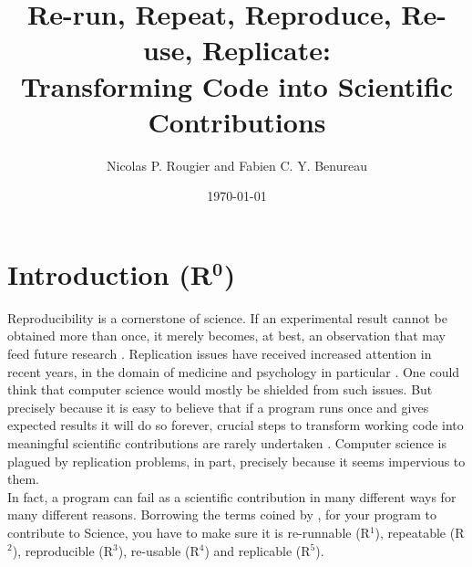 \documentclass[a4paper,11pt]{article}
\title{Re-run, Repeat, Reproduce, Re-use, Replicate:\\Transforming Code into Scientific Contributions}
\author{Nicolas P. Rougier and Fabien C. Y. Benureau}
\date{\today}
\begin{document}
\maketitle
\section*{Introduction (R$^{\mathbf 0}$)}

Reproducibility is a cornerstone of science. 
% 
% 
% 
% 
% 
% 
%
%
If an experimental result cannot be obtained more than once,
it merely becomes, at best, an observation that
may feed future research \cite{Mesirov:2010,osc:2015}. 
Replication issues have received increased attention in recent years,
in the domain of medicine and psychology in particular \cite{Iqbal:2016}.
One could think that computer science would mostly be shielded from such issues.
But precisely because it is easy to believe that
if a program runs once and gives expected results it will do so forever, 
crucial steps to transform working code into meaningful scientific contributions are rarely undertaken \citep{Sandve:2013,Schwab:2000}. 
Computer science is plagued by replication problems,
in part, precisely because it seems impervious to them.\\

In fact, a program can fail as a scientific contribution
in many different ways for many different reasons.
Borrowing the terms coined by \citeauthor{Goble:2016} \citep{Goble:2016},
for your program to contribute to Science,
you have to make sure it is
re-runnable (R$^1$),
repeatable (R$^2$),
reproducible (R$^3$),
re-usable (R$^4$)
and replicable (R$^5$).\\
\end{document}
